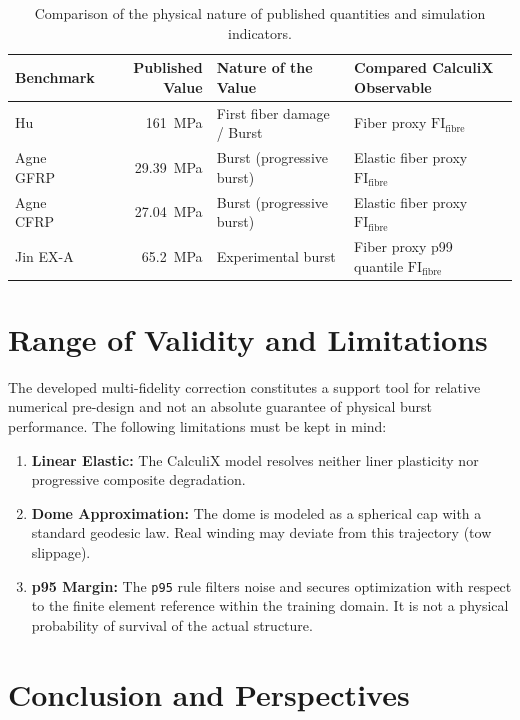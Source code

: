 \documentclass[10pt,twocolumn]{article}
\newcommand{\FI}{\mathrm{FI}}
\begin{document}
\begin{table}[t]
\centering
\caption{Comparison of the physical nature of published quantities and simulation indicators.}
\label{tab:comparison-nature}
\footnotesize
\begin{tabular}{lrll}
\toprule
\textbf{Benchmark} & \textbf{Published Value} & \textbf{Nature of the Value} & \textbf{Compared CalculiX Observable} \\
\midrule
Hu~\citep{Hu2021} & \SI{161}{MPa} & First fiber damage / Burst & Fiber proxy $\FI_{\mathrm{fibre}}$ \\
Agne GFRP~\citep{Agne2025} & \SI{29.39}{MPa} & Burst (progressive burst) & Elastic fiber proxy $\FI_{\mathrm{fibre}}$ \\
Agne CFRP~\citep{Agne2025} & \SI{27.04}{MPa} & Burst (progressive burst) & Elastic fiber proxy $\FI_{\mathrm{fibre}}$ \\
Jin EX-A~\citep{JinPaik2022} & \SI{65.2}{MPa} & Experimental burst & Fiber proxy p99 quantile $\FI_{\mathrm{fibre}}$ \\
\bottomrule
\end{tabular}
\end{table}

\section{Range of Validity and Limitations}

The developed multi-fidelity correction constitutes a support tool for relative numerical pre-design and not an absolute guarantee of physical burst performance. The following limitations must be kept in mind:
\begin{enumerate}
    \item \textbf{Linear Elastic:} The CalculiX model resolves neither liner plasticity nor progressive composite degradation.
    \item \textbf{Dome Approximation:} The dome is modeled as a spherical cap with a standard geodesic law. Real winding may deviate from this trajectory (tow slippage).
    \item \textbf{p95 Margin:} The \texttt{p95} rule filters noise and secures optimization with respect to the finite element reference within the training domain. It is not a physical probability of survival of the actual structure.
\end{enumerate}

\section{Conclusion and Perspectives}
\end{document}
